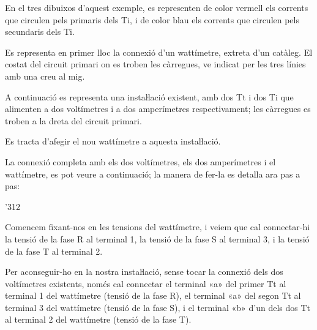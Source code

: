 \begin{exemple}
    En el tres dibuixos d'aquest exemple, es representen de color vermell els corrents que circulen pels primaris dels Ti, i de color blau els corrents que circulen pels secundaris dels Ti.

    Es representa en primer lloc la connexió d'un wattímetre, extreta
    d'un catàleg.   El costat del circuit primari on es troben les càrregues, ve indicat
    per les tres línies amb una creu al mig.

    \begin{center}
        
    \end{center}

    A continuació es representa una instaŀlació existent, amb dos Tt i
    dos Ti que alimenten a dos voltímetres i a dos amperímetres
    respectivament; les càrregues es troben a la dreta del circuit
    primari.

    \begin{center}
        
    \end{center}

    Es tracta d'afegir el nou wattímetre a aquesta
    instaŀlació.

    La connexió completa amb els dos voltímetres, els dos amperímetres i el wattímetre, es pot veure a continuació; la manera de fer-la es detalla ara pas a pas:

    \begin{dingautolist}{'312}

    \item Comencem fixant-nos en les tensions del wattímetre, i veiem que cal
    connectar-hi la tensió de la fase R al terminal 1, la tensió de la
    fase S al terminal 3, i la tensió de la fase T al terminal 2.

    Per aconseguir-ho en la nostra instaŀlació, sense tocar la
    connexió dels dos voltímetres existents, només cal connectar
    el terminal «\textsf{a}» del primer Tt al terminal 1 del wattímetre (tensió de
    la fase R), el terminal «\textsf{a}» del segon Tt al terminal 3 del wattímetre
    (tensió de la fase S), i el terminal «\textsf{b}» d'un dels dos Tt
    al terminal 2 del wattímetre (tensió de la fase T).


\end{dingautolist}
\end{exemple}
